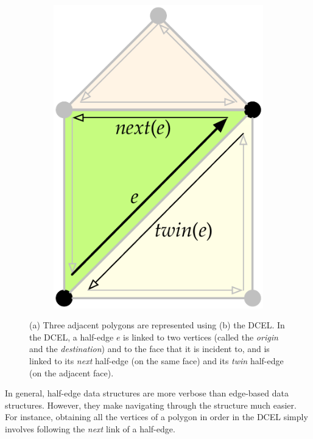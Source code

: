 \begin{figure}
\begin{subfigure}[b]{0.27\linewidth}
\includegraphics[width=\linewidth]{figs/halfedge-2}
\caption{}%
\label{subfig:halfedge-2}
\end{subfigure}
\caption{(a) Three adjacent polygons are represented using (b) the DCEL\@.
In the DCEL, a half-edge \(e\) is linked to two vertices (called the \emph{origin} and the \emph{destination}) and to the face that it is incident to, and is linked to its \emph{next} half-edge (on the same face) and its \emph{twin} half-edge (on the adjacent face).}%
\label{fig:halfedge}
\end{figure}

In general, half-edge data structures are more verbose than edge-based data structures.
However, they make navigating through the structure much easier.
For instance, obtaining all the vertices of a polygon in order in the DCEL simply involves following the \emph{next} link of a half-edge.


